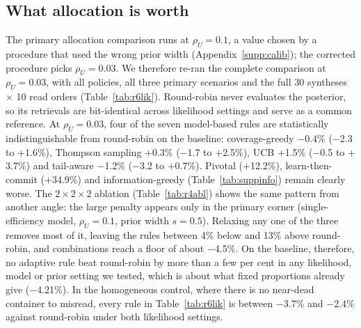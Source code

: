 \documentclass[acmsmall,screen]{acmart}
\begin{document}
\subsection{What allocation is worth}\label{sec:res-alloc}\label{sec:res-lik}


The primary allocation comparison runs at $\rho_U{=}0.1$, a value chosen by a procedure that used the
wrong prior width (Appendix~\ref{supp:calib}); the corrected procedure picks
$\rho_U{=}0.03$.  We therefore re-ran the complete comparison at $\rho_U{=}0.03$, with all policies, all
three primary scenarios and the full 30 syntheses $\times$ 10 read orders (Table~\ref{tab:r6lik}).
Round-robin never evaluates the posterior, so its retrievals are bit-identical across likelihood
settings and serve as a common reference.  At $\rho_U{=}0.03$, four of the seven model-based rules are
statistically indistinguishable from round-robin on the baseline: coverage-greedy $-$0.4\% ($-$2.3 to $+$1.6\%),
Thompson sampling $+$0.3\% ($-$1.7 to $+$2.5\%), UCB $+$1.5\% ($-$0.5 to $+$3.7\%) and tail-aware $-$1.2\% ($-$3.2 to $+$0.7\%).  Pivotal ($+$12.2\%),
learn-then-commit ($+$34.9\%) and information-greedy (Table~\ref{tab:suppinfo})
remain clearly worse.  The $2\times2\times2$ ablation (Table~\ref{tab:r4abl}) shows the same pattern from
another angle: the large penalty appears only in the primary corner (single-efficiency model,
$\rho_U{=}0.1$, prior width $s{=}0.5$).  Relaxing any one of the three removes most of it, leaving the
rules between 4\% below and 13\% above round-robin, and combinations reach a floor of about $-$4.5\%.  On
the baseline, therefore, no adaptive rule beat round-robin by more than a few per cent in any likelihood,
model or prior setting we tested, which is about what fixed proportions already give ($-$4.21\%).  In the
homogeneous control, where there is no near-dead container to misread, every rule in
Table~\ref{tab:r6lik} is between $-$3.7\% and $-$2.4\% against round-robin under both likelihood settings.
\end{document}
